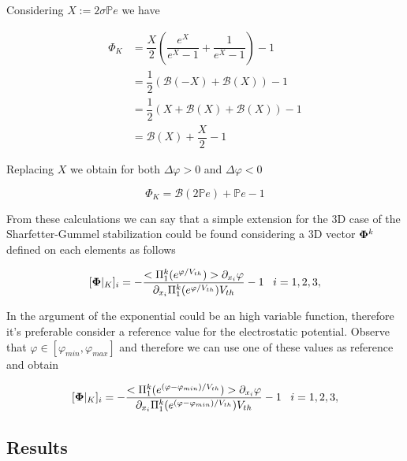 Considering $X := 2 \sigma \mathbb{P}e$ we have

\begin{align*}
\Phi_K & = \dfrac{X}{2} \left( \dfrac{e^{X}}{e^{X}-1} + \dfrac{1}{e^{X}-1} \right) -1 \\
& = \dfrac{1}{2} \left( \mathcal{B}(-X) + \mathcal{B}(X) \right) -1 \\
 & = \dfrac{1}{2} \left( X + \mathcal{B}(X) + \mathcal{B}(X) \right) -1 \\
  & =  \mathcal{B}(X) +\dfrac{X}{2}  -1
\end{align*}

Replacing $X$ we obtain for both $\Delta \varphi > 0$ and $\Delta \varphi < 0$

\begin{equation}
\Phi_K = \mathcal{B}(2\mathbb{P}e) + \mathbb{P}e -1
\end{equation}


From these calculations we can say that a simple extension for the 3D case of the Sharfetter-Gummel stabilization could be found considering a 3D vector  $\mathbf{\Phi}^k$  defined on each elements as follows

\begin{equation}
\label{eq: SG stabilized}
[\vect{\Phi}|_K]_i = -\dfrac{<\Pi_1^k(e^{\varphi/V_{th}})> \partial_{x_i}\varphi}{\partial_{x_i}\Pi_1^k(e^{\varphi/V_{th}})V_{th}} -1 \psp{5} i = 1,2,3,
\end{equation}

In  the argument of the exponential could be an high variable function, therefore it's preferable consider a reference value for the electrostatic potential.
 Observe that $\varphi \in [\varphi_{min},\varphi_{max}]$ and therefore we can use one of these values as reference and obtain
 
 \begin{equation}
\label{eq: SG stabilized}
[\vect{\Phi}|_K]_i = -\dfrac{<\Pi_1^k(e^{(\varphi-\varphi_{min})/V_{th}})> \partial_{x_i}\varphi}{\partial_{x_i}\Pi_1^k(e^{(\varphi-\varphi_{min})/V_{th}})V_{th}} -1 \psp{5} i = 1,2,3,
\end{equation}

\subsection{Results}

